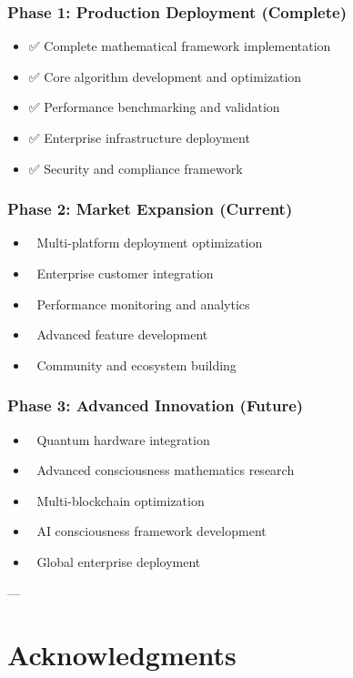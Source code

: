 \documentclass[11pt,a4paper]{article}
\begin{document}
\subsubsection{Phase 1: Production Deployment (Complete)}
\begin{itemize}
\item ✅ Complete mathematical framework implementation
\item ✅ Core algorithm development and optimization
\item ✅ Performance benchmarking and validation
\item ✅ Enterprise infrastructure deployment
\item ✅ Security and compliance framework
\end{itemize}

\subsubsection{Phase 2: Market Expansion (Current)}
\begin{itemize}
\item 🔄 Multi-platform deployment optimization
\item 🔄 Enterprise customer integration
\item 🔄 Performance monitoring and analytics
\item 🔄 Advanced feature development
\item 🔄 Community and ecosystem building
\end{itemize}

\subsubsection{Phase 3: Advanced Innovation (Future)}
\begin{itemize}
\item 🔄 Quantum hardware integration
\item 🔄 Advanced consciousness mathematics research
\item 🔄 Multi-blockchain optimization
\item 🔄 AI consciousness framework development
\item 🔄 Global enterprise deployment
\end{itemize}

---

\section{Acknowledgments}
\end{document}

